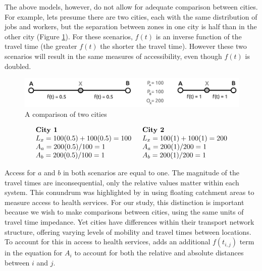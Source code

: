 \documentclass[11 pt, letterpaper]{article}
\begin{document}
{The above models, however, do not allow for adequate comparison between cities. For example, lets presume there are two cities, each with the same distribution of jobs and workers, but the separation between zones in one city is half than in the other city (Figure \ref{S6}). For these scenarios, $f(t)$ is an inverse function of the travel time (the greater $f(t)$ the shorter the travel time). However these two scenarios will result in the same measures of accessibility, even though $f(t)$ is doubled.

\vspace{1mm}
\begin{figure}[H]
	\vspace{1mm}
	\caption{A comparison of two cities} 
	\vspace{1mm}
	\label{S6}
	\centerline{\includegraphics[width=5in]{figures/linear_city/linear_city_2.pdf}}
\end{figure}
\[
\begin{array}{ll}
\textbf{City 1} & \hspace{2mm} \textbf{City 2} \\
L_{x} = 100 (0.5) + 100 (0.5) = 100 & \hspace{2mm} L_{x} = 100 (1) + 100 (1) = 200 \\
A_{a} = 200 (0.5) / 100 = 1 & \hspace{2mm} A_{a} = 200 (1) / 200 = 1 \\
A_{b} = 200 (0.5) / 100 = 1 & \hspace{2mm} A_{b} = 200 (1) / 200 = 1 \\
\end{array}
\]
\vspace{1mm}

Access for $a$ and $b$ in both scenarios are equal to one. The magnitude of the travel times are inconsequential, only the relative values matter within each system. This conundrum was highlighted by  in using floating catchment areas to measure access to health services. For our study, this distinction is important because we wish to make comparisons between cities, using the same units of travel time impedance. Yet cities have differences within their transport network structure, offering varying levels of mobility and travel times between locations. To account for this in access to health services, \cite{delamater2013} adds an additional $f(t_{i,j})$ term in the equation for $A_i$ to account for both the relative and absolute distances between $i$ and $j$.

}
\end{document}
